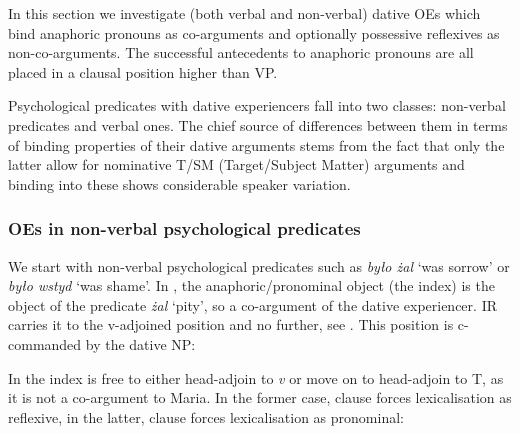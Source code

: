 \documentclass[output=paper,modfonts,nonflat
]{langsci/langscibook}
\begin{document}
In this section we investigate (both verbal and non-verbal) dative OEs which bind anaphoric pronouns as co-arguments and optionally possessive reflexives as non-co-arguments. The successful antecedents to anaphoric pronouns are all placed in a clausal position higher than VP.

Psychological predicates with dative experiencers fall into two classes: non-verbal predicates and verbal ones. The chief source of differences between them in terms of binding properties of their dative arguments stems from the fact that only the latter allow for nominative T/SM (Target/Subject Matter) arguments and binding into these shows considerable speaker variation. 


\subsubsection{OEs in non-verbal psychological predicates}\label{s3.2.1}

We start with non-verbal psychological predicates such as \textit{było żal} ‘was sorrow’ or \textit{było wstyd} ‘was shame’. In , the anaphoric/pronominal object (the index) is the object of the predicate \textit{żal}  ‘pity’, so a co-argument of the dative experiencer. IR carries it to the v-adjoined position and no further, see . This position is c-commanded by the dative NP:


\ea \label{ex:witkos:34}
	\z
\z
                
\noindent In  the index is free to either head-adjoin to \textit{v} or move on to head-adjoin to T, as it is not a co-argument to Maria. In the former case, clause  forces lexicalisation as reflexive, in the latter, clause  forces lexicalisation as pronominal:

\ea \label{ex:witkos:35}
	\z
\z
\end{document}
